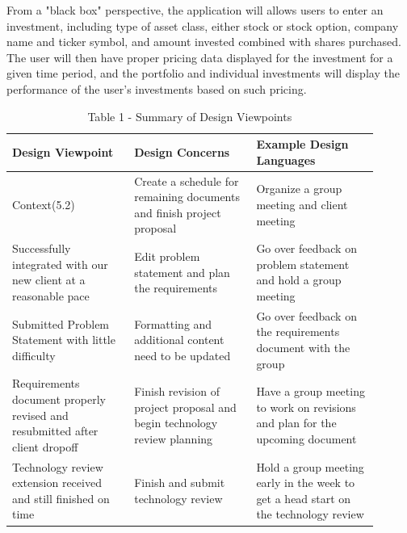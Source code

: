 \documentclass[onecolumn, draftclsnofoot,10pt, compsoc]{IEEEtran}
\begin{document}
        From a "black box" perspective, the application will allows users to enter an investment, including type of asset class, either stock or stock option, company name and ticker symbol,
        and amount invested combined with shares purchased. The user will then have proper pricing data displayed for the investment for a given time period, and the portfolio and individual
        investments will display the performance of the user's investments based on such pricing.
\begin{table}
                        \caption{Table 1 - Summary of Design Viewpoints}
                                \begin{tabular}{| p{0.3\linewidth} | p{0.3\linewidth} | p{0.3\linewidth} | }
                                        \hline
                                         \textbf{Design Viewpoint} & \textbf{Design Concerns} & \textbf{Example Design Languages} \\ [0.5ex]
                                        \hline
                                        Context(5.2)  & Create a schedule for remaining documents and finish project proposal & Organize a group meeting and client meeting  \\
                                        \hline
                                         Successfully integrated with our new client at a reasonable pace & Edit problem statement and plan the requirements & Go over feedback on problem statement and hold a group meeting \\
                                        \hline
                                         Submitted Problem Statement with little difficulty & Formatting and additional content need to be updated & Go over feedback on the requirements document with the group \\
                                        \hline
                                        Requirements document properly revised and resubmitted after client dropoff & Finish revision of project proposal and begin technology review planning & Have a group meeting to work on revisions and plan for the upcoming document\\
                                        \hline
                                        Technology review extension received and still finished on time & Finish and submit technology review & Hold a group meeting early in the week to get a head start on the technology review\\
                                        \hline

\end{tabular}
\end{table}
\end{document}
